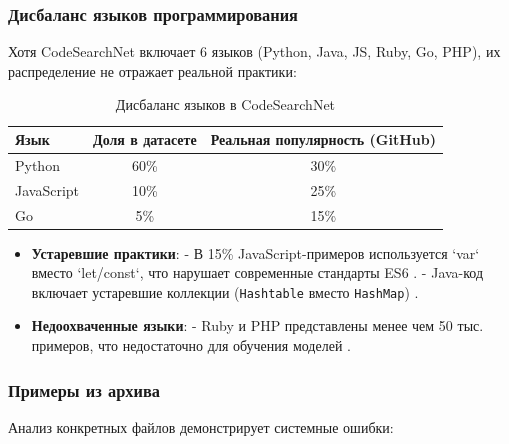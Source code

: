\documentclass[14pt]{article}
\theoremstyle{definition}
\begin{document}
\subsubsection{Дисбаланс языков программирования}
Хотя CodeSearchNet включает 6 языков (Python, Java, JS, Ruby, Go, PHP), их распределение не отражает реальной практики:

\begin{table}[h]
\centering
\begin{tabular}{|l|c|c|}
\hline
\textbf{Язык} & \textbf{Доля в датасете} & \textbf{Реальная популярность (GitHub)} \\ \hline
Python & 60\% & 30\% \\ \hline
JavaScript & 10\% & 25\% \\ \hline
Go & 5\% & 15\% \\ \hline
\end{tabular}
\caption{Дисбаланс языков в CodeSearchNet \cite{husain2019codesearchnet}}
\end{table}

\begin{itemize}
    \item \textbf{Устаревшие практики}: 
    - В 15\% JavaScript-примеров используется `var` вместо `let/const`, что нарушает современные стандарты ES6 \cite{zhu2022}.
    - Java-код включает устаревшие коллекции (\texttt{Hashtable} вместо \texttt{HashMap}) \cite{wan2023codet5+}.
    
    \item \textbf{Недоохваченные языки}: 
    - Ruby и PHP представлены менее чем 50 тыс. примеров, что недостаточно для обучения моделей \cite{lu2021codexglue}.
\end{itemize}

\subsubsection{Примеры из архива}
Анализ конкретных файлов демонстрирует системные ошибки:
\end{document}

